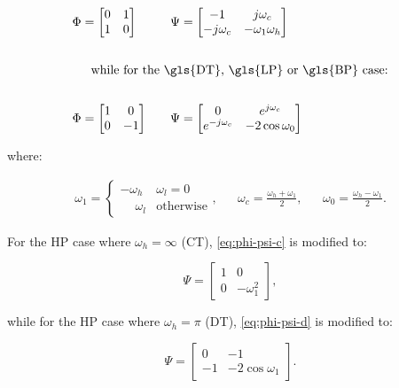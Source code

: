 \begin{lem}
	\begin{align}
		&\Phi =
		\begin{bmatrix}
			0 & 1 \\
			1 & 0
		\end{bmatrix} &&
		&&\Psi =
		\begin{bmatrix}
			-1 & j\omega_c \\
			-j\omega_c & -\omega_1\omega_h
		\end{bmatrix} \label{eq:phi-psi-c} \\ \notag \\
		\shortintertext{\indent while for the \gls{DT}, \gls{LP} or \gls{BP} case:} \notag \\
		&\Phi =
		\begin{bmatrix}
			1 & 0 \\
			0 & -1
		\end{bmatrix} &&
		&&\Psi =
		\begin{bmatrix}
			0 & e^{j\omega_c} \\
			e^{-j\omega_c} & -2\cos{\omega_0} 
		\end{bmatrix} \label{eq:phi-psi-d}
	\end{align}
	
	where:
	
	\begin{align*}
		\omega_1 =
		\begin{cases}
			-\omega_h & \omega_l = 0 \\
			\phantom{-}\omega_l & \text{otherwise}
		\end{cases}, &&
		\omega_c = \frac{\omega_h + \omega_1}{2}, &&
		\omega_0 = \frac{\omega_h - \omega_1}{2}.
	\end{align*}
	
	For the \gls{HP} case where $\omega_h = \infty$ (\gls{CT}), \autoref{eq:phi-psi-c} is modified to:
	
	\begin{equation}
		\Psi = 
		\begin{bmatrix}
			1 & 0 \\
			0 & -\omega_1^2
		\end{bmatrix},
	\end{equation}
	
	while for the \gls{HP} case where $\omega_h = \pi$ (\gls{DT}), \autoref{eq:phi-psi-d} is modified to:
	
	\begin{equation}
		\Psi =
		\begin{bmatrix}
			0 & -1 \\
			-1 & -2\cos{\omega_1}
		\end{bmatrix}.
	\end{equation}

\end{lem}

